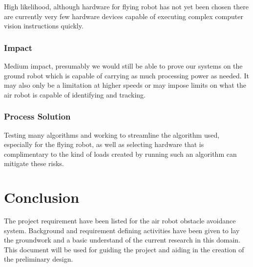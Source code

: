 \documentclass{article}
\begin{document}
		High likelihood, although hardware for flying robot has not yet been chosen there are currently very few hardware devices capable of executing complex computer vision instructions quickly. 
		
		\subsubsection{Impact}
		
		Medium impact, presumably we would still be able to prove our systems on the ground robot which is capable of carrying as much processing power as needed. It may also only be a limitation at higher speeds or may impose limits on what the air robot is capable of identifying and tracking. 
		
		\subsubsection{Process Solution}
		
		Testing many algorithms and working to streamline the algorithm used, especially for the flying robot, as well as selecting hardware that is complimentary to the kind of loads created by running such an algorithm can mitigate these risks. 
	

\section{Conclusion}

The project requirement have been listed for the air robot obstacle avoidance system. Background and requirement defining activities have been given to lay the groundwork and a basic understand of the current research in this domain. This document will be used for guiding the project and aiding in the creation of the preliminary design. 


\printbibliography

\end{document}
